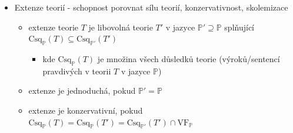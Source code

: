 \begin{itemize}
\begin{itemize}
\begin{itemize}
\end{itemize}
\item neekvivalentních výroků nad $\mathbb P$ pravdivých/lživých v $T$ je $2^{2^n-m}$
\begin{itemize}
\item u pravdivých musí množina modelů obsahovat všech $m$ modelů, takže je zafixujeme (u lživých naopak nesmí obsahovat žádný z nich)
\end{itemize}
\item neekv. výroků nad $\mathbb P$ nezávislých v $T$ je $2^{2^n}-2\cdot 2^{2^n-m}$
\begin{itemize}
\item vezmeme všechny a odečteme pravdivé a lživé
\end{itemize}
\item neekv. jednoduchých extenzí teorie $T$ je $2^m$, z toho sporná je jedna
\begin{itemize}
\item podle toho, které modely ubereme
\end{itemize}
\item neekv. kompletních jednoduchých extenzí teorie $T$ je $m$
\begin{itemize}
\item každá odpovídá jednomu modelu
\end{itemize}
\item $T$-neekvivalentních výroků nad $\mathbb P$ je $2^m$
\item $T$-neekv. výroků nad $\mathbb P$ pravdivých/lživých (v $T$) je $1$
\item $T$-neekv. výroků nad $\mathbb P$ nezávislých (v $T$) je $2^m-2$
\end{itemize}
\item Extenze teorií - schopnost porovnat sílu teorií, konzervativnost, skolemizace
\begin{itemize}
\item extenze teorie $T$ je libovolná teorie $T'$ v jazyce $\mathbb P'\supseteq\mathbb P$ splňující $\text{Csq}_{\mathbb P}(T)\subseteq\text{Csq}_{\mathbb P'}(T')$
\begin{itemize}
\item kde $\text{Csq}_\mathbb P(T)$ je množina všech důsledků teorie (výroků/sentencí pravdivých v teorii $T$ v jazyce $\mathbb P$)
\end{itemize}
\item extenze je jednoduchá, pokud $\mathbb P'=\mathbb P$
\item extenze je konzervativní, pokud $\text{Csq}_{\mathbb P}(T)=\text{Csq}_{\mathbb P}(T')=\text{Csq}_{\mathbb P'}(T')\cap\text{VF}_\mathbb P$

\end{itemize}
\end{itemize}
